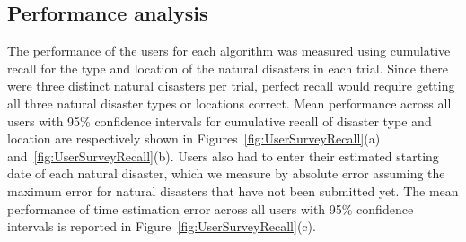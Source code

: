


\subsection{Performance analysis}

The performance of the users for each algorithm was measured using cumulative recall for the type and location of the natural disasters in each trial.  Since there were three distinct natural disasters per trial,  perfect recall would require getting all three natural disaster types or locations correct.  Mean performance across all users with 95\% confidence intervals for cumulative recall of disaster type and location are respectively shown in Figures~\ref{fig:UserSurveyRecall}(a) and~\ref{fig:UserSurveyRecall}(b).  Users also had to enter their estimated starting date of each natural disaster, which we measure by absolute error assuming the maximum error for natural disasters that have not been submitted yet.  The mean performance of time estimation error across all users with 95\% confidence intervals is reported in Figure~\ref{fig:UserSurveyRecall}(c).  %

